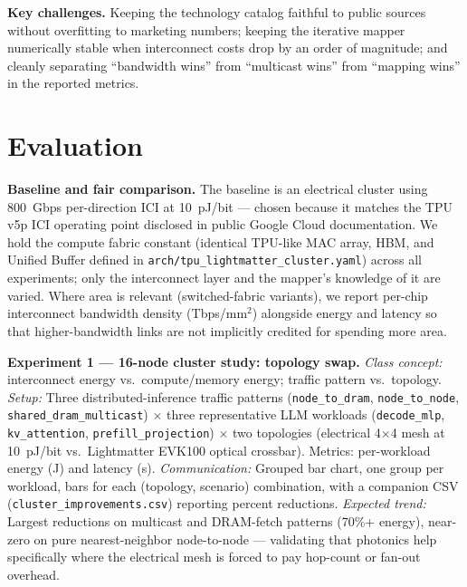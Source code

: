 \documentclass[conference,onecolumn]{IEEEtran}
\begin{document}
\textbf{Key challenges.}
Keeping the technology catalog faithful to public sources without overfitting
to marketing numbers; keeping the iterative mapper numerically stable when
interconnect costs drop by an order of magnitude; and cleanly separating
``bandwidth wins'' from ``multicast wins'' from ``mapping wins'' in the
reported metrics.


\section{Evaluation}
\textbf{Baseline and fair comparison.}
The baseline is an electrical cluster using 800~Gbps per-direction ICI at
10~pJ/bit --- chosen because it matches the TPU v5p ICI operating point
disclosed in public Google Cloud documentation. We hold the compute fabric
constant (identical TPU-like MAC array, HBM, and Unified Buffer defined in
\texttt{arch/tpu\_lightmatter\_cluster.yaml}) across all experiments; only the
interconnect layer and the mapper's knowledge of it are varied. Where area is
relevant (switched-fabric variants), we report per-chip interconnect
bandwidth density (Tbps/mm$^2$) alongside energy and latency so that
higher-bandwidth links are not implicitly credited for spending more area.

\textbf{Experiment 1 --- 16-node cluster study: topology swap.}
\emph{Class concept:} interconnect energy vs.\ compute/memory energy; traffic
pattern vs.\ topology.
\emph{Setup:} Three distributed-inference traffic patterns
(\texttt{node\_to\_dram}, \texttt{node\_to\_node},
\texttt{shared\_dram\_multicast}) $\times$ three representative LLM workloads
(\texttt{decode\_mlp}, \texttt{kv\_attention}, \texttt{prefill\_projection})
$\times$ two topologies (electrical 4$\times$4 mesh at 10~pJ/bit vs.\ Lightmatter
EVK100 optical crossbar). Metrics: per-workload energy (J) and latency (s).
\emph{Communication:} Grouped bar chart, one group per workload, bars for each
(topology, scenario) combination, with a companion CSV
(\texttt{cluster\_improvements.csv}) reporting percent reductions.
\emph{Expected trend:} Largest reductions on multicast and DRAM-fetch patterns
(70\%+ energy), near-zero on pure nearest-neighbor node-to-node --- validating
that photonics help specifically where the electrical mesh is forced to pay
hop-count or fan-out overhead.
\end{document}
